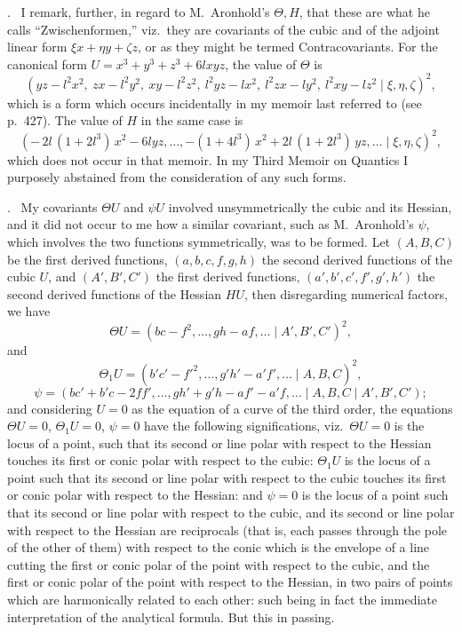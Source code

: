 \documentclass[11pt]{article}
\newcommand{\Cdel}{\mid}
\begin{document}
\medskip

. \ I remark, further, in regard to M.~Aronhold's $\Theta, H$, that these are what he calls ``Zwischenformen,'' viz.\ they are covariants of the cubic and of the adjoint linear form $\xi x + \eta y + \zeta z$, or as they might be termed Contracovariants. For the canonical form $U = x^3 + y^3 + z^3 + 6 l x y z$, the value of $\Theta$ is
\[
   (y z - l^2 x^2,\ z x - l^2 y^2,\ x y - l^2 z^2,\ l^2 y z - l x^2,\ l^2 z x - l y^2,\ l^2 x y - l z^2\Cdel\xi, \eta, \zeta)^2,
\]
which is a form which occurs incidentally in my memoir last referred to (see p.~427). The value of $H$ in the same case is
\[
   (-\,2 l\,(1 + 2 l^3)\,x^2 - 6 l y z,\ldots,-(1 + 4 l^3)\,x^2 + 2 l\,(1 + 2 l^3)\,y z,\ldots\Cdel\xi, \eta, \zeta)^2,
\]
which does not occur in that memoir. In my Third Memoir on Quantics I purposely abstained from the consideration of any such forms.

\medskip

. \ My covariants $\Theta U$ and $\psi U$ involved unsymmetrically the cubic and its Hessian, and it did not occur to me how a similar covariant, such as M.~Aronhold's $\psi$, which involves the two functions symmetrically, was to be formed. Let $(A, B, C)$ be the first derived functions, $(a, b, c, f, g, h)$ the second derived functions of the cubic $U$, and $(A', B', C')$ the first derived functions, $(a', b', c', f', g', h')$ the second derived functions of the Hessian $H U$, then disregarding numerical factors, we have
\[
   \Theta U = (b c - f^2,\ldots,g h - a f,\ldots\Cdel A', B', C')^2,
\]
and
\[
   \Theta_1 U = (b' c' - f'^2,\ldots,g' h' - a' f',\ldots\Cdel A, B, C)^2,
\]
\[
   \psi = (b c' + b' c - 2 f f',\ldots,g h' + g' h - a f' - a' f,\ldots\Cdel A, B, C\Cdel A', B', C');
\]
and considering $U = 0$ as the equation of a curve of the third order, the equations $\Theta U = 0$, $\Theta_1 U = 0$, $\psi = 0$ have the following significations, viz.\ $\Theta U = 0$ is the locus of a point, such that its second or line polar with respect to the Hessian touches its first or conic polar with respect to the cubic: $\Theta_1 U$ is the locus of a point such that its second or line polar with respect to the cubic touches its first or conic polar with respect to the Hessian: and $\psi = 0$ is the locus of a point such that its second or line polar with respect to the cubic, and its second or line polar with respect to the Hessian are reciprocals (that is, each passes through the pole of the other of them) with respect to the conic which is the envelope of a line cutting the first or conic polar of the point with respect to the cubic, and the first or conic polar of the point with respect to the Hessian, in two pairs of points which are harmonically related to each other: such being in fact the immediate interpretation of the analytical formula. But this in passing.
\end{document}
